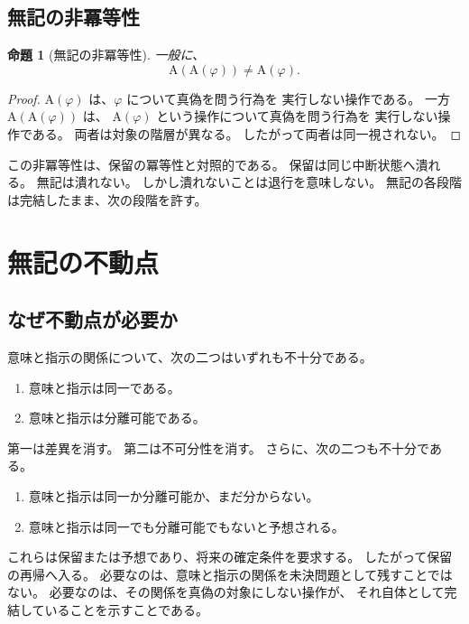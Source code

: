 \documentclass[11pt,a4paper,ja=standard,lualatex]{bxjsarticle}
\newtheorem{proposition}{命題}
\begin{document}
\subsection{無記の非冪等性}

\begin{proposition}[無記の非冪等性]
一般に、
\begin{equation}
\mathrm{A}(\mathrm{A}(\varphi))\neq\mathrm{A}(\varphi).
\end{equation}
\end{proposition}

\begin{proof}
$\mathrm{A}(\varphi)$ は、$\varphi$ について真偽を問う行為を
実行しない操作である。
一方 $\mathrm{A}(\mathrm{A}(\varphi))$ は、
$\mathrm{A}(\varphi)$ という操作について真偽を問う行為を
実行しない操作である。
両者は対象の階層が異なる。
したがって両者は同一視されない。
\end{proof}

この非冪等性は、保留の冪等性と対照的である。
保留は同じ中断状態へ潰れる。
無記は潰れない。
しかし潰れないことは退行を意味しない。
無記の各段階は完結したまま、次の段階を許す。

\section{無記の不動点}

\subsection{なぜ不動点が必要か}

意味と指示の関係について、次の二つはいずれも不十分である。

\begin{enumerate}
\item 意味と指示は同一である。
\item 意味と指示は分離可能である。
\end{enumerate}

第一は差異を消す。
第二は不可分性を消す。
さらに、次の二つも不十分である。

\begin{enumerate}
\item 意味と指示は同一か分離可能か、まだ分からない。
\item 意味と指示は同一でも分離可能でもないと予想される。
\end{enumerate}

これらは保留または予想であり、将来の確定条件を要求する。
したがって保留の再帰へ入る。
必要なのは、意味と指示の関係を未決問題として残すことではない。
必要なのは、その関係を真偽の対象にしない操作が、
それ自体として完結していることを示すことである。
\end{document}
